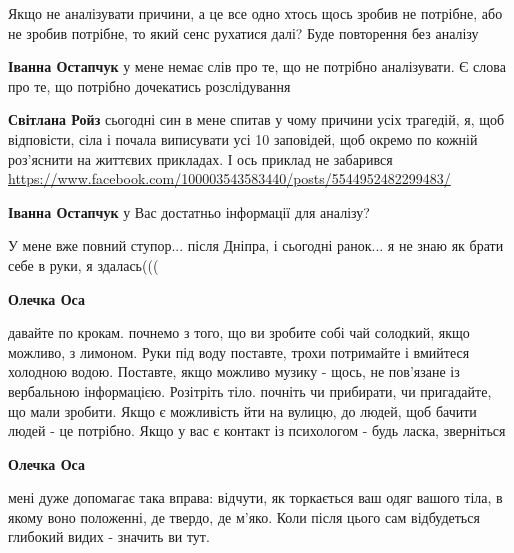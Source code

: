  
 
 
 
 

\qqSecCmt

\begin{itemize} %

Якщо не аналізувати причини, а це все одно хтось щось зробив не потрібне, або
не зробив потрібне, то який сенс рухатися далі? Буде повторення без аналізу

\begin{itemize} %
\textbf{Іванна Остапчук} у мене немає слів про те, що не потрібно аналізувати. Є слова про те, що потрібно дочекатись розслідування

\textbf{Світлана Ройз} сьогодні син в мене спитав у чому причини усіх трагедій, я, щоб відповісти, сіла і почала виписувати усі 10 заповідей, щоб окремо по кожній роз'яснити на життєвих прикладах. І ось приклад не забарився
\url{https://www.facebook.com/100003543583440/posts/5544952482299483/}

\textbf{Іванна Остапчук} у Вас достатньо інформації для аналізу?
\end{itemize} %


У мене вже повний ступор... після Дніпра, і сьогодні ранок... я не знаю як брати себе в руки, я здалась(((

\begin{itemize} %
\textbf{Олечка Оса} 

давайте по крокам. почнемо з того, що ви зробите собі чай солодкий, якщо
можливо, з лимоном. Руки під воду поставте, трохи потримайте і вмийтеся
холодною водою. Поставте, якщо можливо музику - щось, не пов'язане із
вербальною інформацією. Розітріть тіло. почніть чи прибирати, чи пригадайте, що
мали зробити. Якщо є можливість йти на вулицю, до людей, щоб бачити людей - це
потрібно. Якщо у вас є контакт із психологом - будь ласка, зверніться

\textbf{Олечка Оса} 

мені дуже допомагає така вправа: відчути, як торкається ваш одяг вашого тіла, в
якому воно положенні, де твердо, де м'яко. Коли після цього сам відбудеться
глибокий видих - значить ви тут.


\end{itemize}
\end{itemize}
